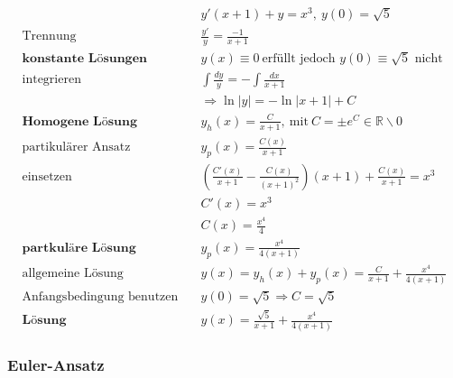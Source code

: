 \begin{equation*}
\begin{split}
& y'(x+1) + y = x^3,\ y(0) = \sqrt{5} \\
\text{Trennung}\quad & \frac{y'}{y} = \frac{-1}{x+1} \\
\textbf{konstante L{\"o}sungen}\quad & y(x) \equiv 0\ \text{erf{\"u}llt jedoch $y(0) \equiv \sqrt{5}$ nicht} \\
\text{integrieren}\quad & \int \frac{dy}{y} = - \int \frac{dx}{x+1} \\
& \Rightarrow \ln|y| = -\ln|x+1| + C \\
\textbf{Homogene L{\"o}sung} \quad & y_h(x) = \frac{C}{x+1},\ \text{mit}\ C= \pm e^C \in \mathbb{R}\backslash{0} \\
\text{partikul{\"a}rer Ansatz}\quad & y_p(x) = \frac{C(x)}{x+1} \\
\text{einsetzen} \quad & (\frac{C'(x)}{x+1} - \frac{C(x)}{(x+1)^2})(x+1) + \frac{C(x)}{x+1} = x^3 \\
& C'(x) = x^3 \\
& C(x) = \frac{x^4}{4} \\
\textbf{partkul{\"a}re L{\"o}sung} \quad & y_p(x) = \frac{x^4}{4(x+1)} \\
\text{allgemeine L{\"o}sung}\quad & y(x) = y_h(x) + y_p(x) = \frac{C}{x+1} + \frac{x^4}{4(x+1)} \\
\text{Anfangsbedingung benutzen} \quad & y(0) = \sqrt{5} \Rightarrow C = \sqrt{5} \\
\textbf{L{\"o}sung} \quad & y(x) = \frac{\sqrt{5}}{x+1} + \frac{x^4}{4(x+1)}
\end{split}
\end{equation*}

%



\subsubsection{Euler-Ansatz}

